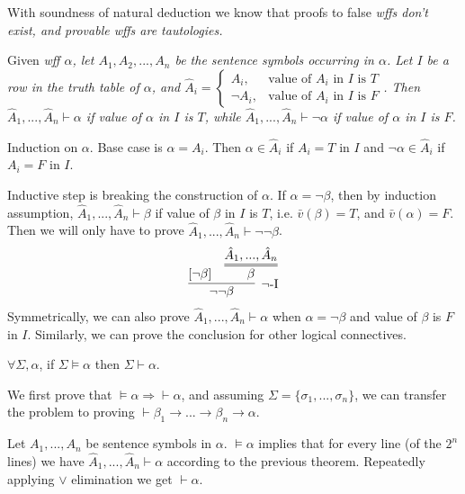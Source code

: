\documentclass{article}
\begin{document}
\QED

With soundness of natural deduction we know that proofs to false \it{wff}s don't exist, and provable \it{wff}s are tautologies.

\Thm {}
	Given \it{wff} $\alpha$, let $A_1, A_2,...,A_n$ be the sentence symbols occurring in $\alpha$. Let $I$ be a row in the truth table of $\alpha$, and $\hat{A}_i = \begin{cases} A_i, & \text{value of } A_i \text{ in } I \text{ is } T \\ \neg A_i, & \text{value of } A_i \text{ in } I \text{ is } F \end{cases}$. Then $\hat{A}_1, ..., \hat{A}_n \vdash \alpha$ if value of $\alpha$ in $I$ is $T$, while $\hat{A}_1,...,\hat{A}_n \vdash \neg \alpha$ if value of $\alpha$ in $I$ is $F$.
	
\Proof
	Induction on $\alpha$. Base case is $\alpha = A_i$. Then $\alpha \in \hat{A}_i$ if $A_i=T$ in $I$ and $\neg\alpha \in \hat{A}_i$ if $A_i=F$ in $I$.
	
	Inductive step is breaking the construction of $\alpha$. If $\alpha = \neg \beta$, then by induction assumption, $\hat{A}_1,...,\hat{A}_n \vdash \beta$ if value of $\beta$ in $I$ is $T$, i.e. $\bar{v}(\beta)=T$, and $\bar{v}(\alpha)=F$. Then we will only have to prove $\hat{A}_1, ..., \hat{A}_n \vdash \neg\neg\beta$.
\begin{align*}
	\infer[\neg\text{-I}] {\neg\neg\beta} {[\neg\beta] & \infer={\beta} {\hat{A}_1,...,\hat{A}_n} }
\end{align*}
Symmetrically, we can also prove $\hat{A}_1,...,\hat{A}_n \vdash \alpha$ when $\alpha=\neg\beta$ and value of $\beta$ is $F$ in $I$. Similarly, we can prove the conclusion for other logical connectives.
	
\QED

	$\forall \Sigma, \alpha$, if $\Sigma \vDash \alpha$ then $\Sigma \vdash \alpha$.

\Proof
	We first prove that $\vDash \alpha \Rightarrow \vdash \alpha$, and assuming $\Sigma = \{ \sigma_1,...,\sigma_n \}$, we can transfer the problem to proving $\vdash \beta_1 \to ... \to \beta_n \to \alpha$.
	
	Let $A_1,...,A_n$ be sentence symbols in $\alpha$. $\vDash \alpha$ implies that for every line (of the $2^n$ lines) we have $\hat{A}_1,...,\hat{A}_n \vdash \alpha$ according to the previous theorem. Repeatedly applying $\lor$ elimination we get $\vdash \alpha$.
	
\end{document}
